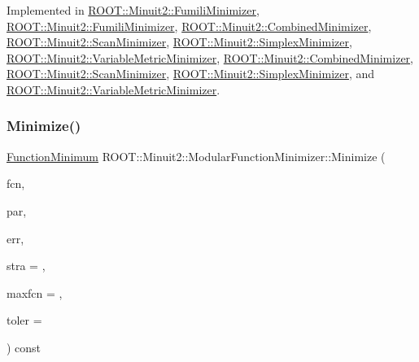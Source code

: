Implemented in \mbox{\hyperlink{classROOT_1_1Minuit2_1_1FumiliMinimizer_a24d20e7cd4a335f60616fd7cafe0739c}{R\+O\+O\+T\+::\+Minuit2\+::\+Fumili\+Minimizer}}, \mbox{\hyperlink{classROOT_1_1Minuit2_1_1FumiliMinimizer_a24d20e7cd4a335f60616fd7cafe0739c}{R\+O\+O\+T\+::\+Minuit2\+::\+Fumili\+Minimizer}}, \mbox{\hyperlink{classROOT_1_1Minuit2_1_1CombinedMinimizer_a73befc9c0bdfe8c9f09638505772c5ed}{R\+O\+O\+T\+::\+Minuit2\+::\+Combined\+Minimizer}}, \mbox{\hyperlink{classROOT_1_1Minuit2_1_1ScanMinimizer_a6ca4b63ec20ed8dd310e02d427ef05fa}{R\+O\+O\+T\+::\+Minuit2\+::\+Scan\+Minimizer}}, \mbox{\hyperlink{classROOT_1_1Minuit2_1_1SimplexMinimizer_a388494c3f9b45ce6c5d91decef737608}{R\+O\+O\+T\+::\+Minuit2\+::\+Simplex\+Minimizer}}, \mbox{\hyperlink{classROOT_1_1Minuit2_1_1VariableMetricMinimizer_aa31a52e431960a91acf0b9c2997b397b}{R\+O\+O\+T\+::\+Minuit2\+::\+Variable\+Metric\+Minimizer}}, \mbox{\hyperlink{classROOT_1_1Minuit2_1_1CombinedMinimizer_a73befc9c0bdfe8c9f09638505772c5ed}{R\+O\+O\+T\+::\+Minuit2\+::\+Combined\+Minimizer}}, \mbox{\hyperlink{classROOT_1_1Minuit2_1_1ScanMinimizer_a6ca4b63ec20ed8dd310e02d427ef05fa}{R\+O\+O\+T\+::\+Minuit2\+::\+Scan\+Minimizer}}, \mbox{\hyperlink{classROOT_1_1Minuit2_1_1SimplexMinimizer_a388494c3f9b45ce6c5d91decef737608}{R\+O\+O\+T\+::\+Minuit2\+::\+Simplex\+Minimizer}}, and \mbox{\hyperlink{classROOT_1_1Minuit2_1_1VariableMetricMinimizer_aa31a52e431960a91acf0b9c2997b397b}{R\+O\+O\+T\+::\+Minuit2\+::\+Variable\+Metric\+Minimizer}}.

\mbox{\label{classROOT_1_1Minuit2_1_1ModularFunctionMinimizer_a8cbcb596782a34f43e4ce1c48865d0b7}} 
\subsubsection{\texorpdfstring{Minimize()}{Minimize()}\hspace{0.1cm}{\footnotesize\ttfamily [1/22]}}
{\footnotesize\ttfamily \mbox{\hyperlink{classROOT_1_1Minuit2_1_1FunctionMinimum}{Function\+Minimum}} R\+O\+O\+T\+::\+Minuit2\+::\+Modular\+Function\+Minimizer\+::\+Minimize (\begin{DoxyParamCaption}\item[{const \mbox{\hyperlink{classROOT_1_1Minuit2_1_1FCNBase}{F\+C\+N\+Base}} \&}]{fcn,  }\item[{const std\+::vector$<$ double $>$ \&}]{par,  }\item[{const std\+::vector$<$ double $>$ \&}]{err,  }\item[{unsigned int}]{stra = {},  }\item[{unsigned int}]{maxfcn = {},  }\item[{double}]{toler = {} }\end{DoxyParamCaption}) const\hspace{0.3cm}{\ttfamily [virtual]}}



